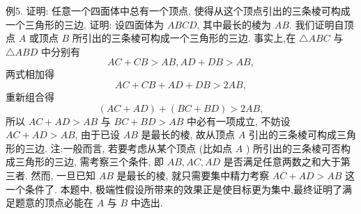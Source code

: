 例5. 证明: 任意一个四面体中总有一个顶点, 使得从这个顶点引出的三条棱可构成一个三角形的三边.
证明: 设四面体为 $A B C D$, 其中最长的棱为 $A B$. 我们证明自顶点 $A$ 或顶点 $B$ 所引出的三条棱可构成一个三角形的三边.
事实上,在 $\triangle A B C$ 与 $\triangle A B D$ 中分别有
$$
A C+C B>A B, A D+D B>A B,
$$
两式相加得
$$
A C+C B+A D+D B>2 A B,
$$
重新组合得
$$
(A C+A D)+(B C+B D)>2 A B,
$$
所以 $A C+A D>A B$ 与 $B C+B D>A B$ 中必有一项成立, 不妨设 $A C+ A D>A B$, 由于已设 $A B$ 是最长的棱, 故从顶点 $A$ 引出的三条棱可构成三角形的三边.
注:一般而言, 若要考虑从某个顶点 (比如点 $A$ ) 所引出的三条棱可否构成三角形的三边, 需考察三个条件, 即 $A B, A C, A D$ 是否满足任意两数之和大于第三者.
然而, 一旦已知 $A B$ 是最长的棱, 就只需要集中精力考察 $A C+ A D>A B$ 这一个条件了.
本题中, 极端性假设所带来的效果正是使目标更为集中,最终证明了满足题意的顶点必能在 $A$ 与 $B$ 中选出.



